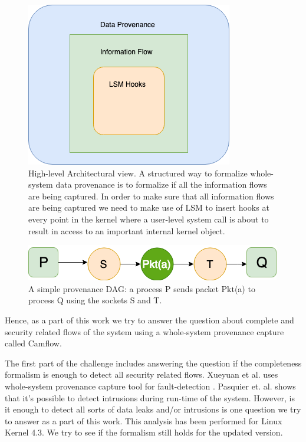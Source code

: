 \documentclass{IEEEtran}
\begin{document}
\begin{figure}
	\centering
	\includegraphics[width=0.7\linewidth]{Architecture-diagram}
	\caption[]{High-level Architectural view. A structured way to formalize whole-system data provenance is to formalize if all the information flows are being captured. In order to make sure that all information flows are being captured we need to make use of LSM to insert hooks at every point in the kernel where a user-level system call is about to result in access to an important internal kernel object.}
	\label{fig:architecture-diagram}
\end{figure}

\begin{figure}
	\centering
	\includegraphics[width=0.7\linewidth]{DAG}
	\caption{A simple provenance DAG: a process P sends packet Pkt(a) to process Q using the sockets S and T.}
	\label{fig:dag}
\end{figure}





Hence, as a part of this work we try to answer the question about complete and security related flows of the system using a whole-system provenance capture called Camflow.\cite{b7}

The first part of the challenge includes answering the question if the completeness formalism is enough to detect all security related flows. Xueyuan et al. uses whole-system provenance capture tool for fault-detection \cite{b8}. Pasquier et. al. \cite{b6} shows that it's possible to detect intrusions during run-time of the system. However, is it enough to detect all sorts of data leaks and/or intrusions is one question we try to answer as a part of this work. This analysis has been performed for Linux Kernel 4.3. We try to see if the formalism still holds for the updated version.     
\end{document}
